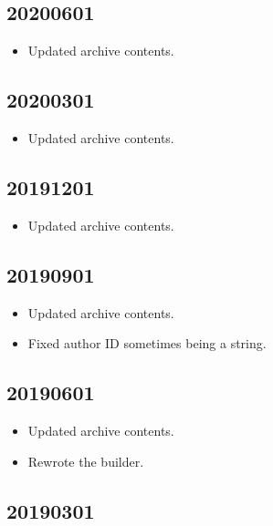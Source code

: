 \documentclass[hidelinks,a4paper,12pt]{article}
\begin{document}
\subsection{20200601}  \label{sec:changelog_20200601}

\begin{itemize}
\item Updated archive contents.
\end{itemize}

\subsection{20200301}  \label{sec:changelog_20200301}

\begin{itemize}
\item Updated archive contents.
\end{itemize}

\subsection{20191201}  \label{sec:changelog_20191201}

\begin{itemize}
\item Updated archive contents.
\end{itemize}

\subsection{20190901}  \label{sec:changelog_20190901}

\begin{itemize}
\item Updated archive contents.
\item Fixed author ID sometimes being a string.
\end{itemize}

\subsection{20190601}  \label{sec:changelog_20190601}

\begin{itemize}
\item Updated archive contents.
\item Rewrote the builder.
\end{itemize}

\subsection{20190301}  \label{sec:changelog_20190301}
\end{document}

